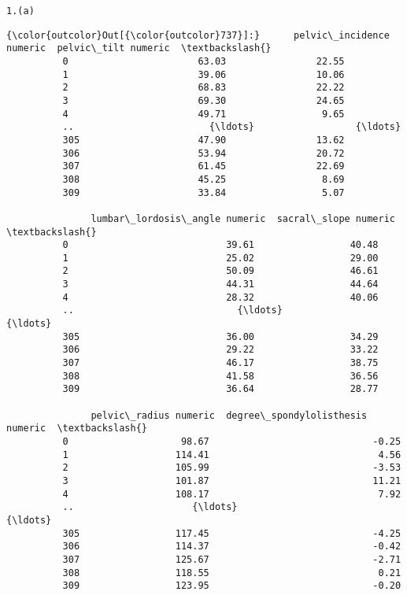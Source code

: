 \documentclass[11pt]{article}
\begin{document}
    \begin{Verbatim}[commandchars=\\\{\}]
1.(a)

    \end{Verbatim}

\begin{Verbatim}[commandchars=\\\{\}]
{\color{outcolor}Out[{\color{outcolor}737}]:}      pelvic\_incidence numeric  pelvic\_tilt numeric  \textbackslash{}
          0                       63.03                22.55   
          1                       39.06                10.06   
          2                       68.83                22.22   
          3                       69.30                24.65   
          4                       49.71                 9.65   
          ..                        {\ldots}                  {\ldots}   
          305                     47.90                13.62   
          306                     53.94                20.72   
          307                     61.45                22.69   
          308                     45.25                 8.69   
          309                     33.84                 5.07   
          
               lumbar\_lordosis\_angle numeric  sacral\_slope numeric  \textbackslash{}
          0                            39.61                 40.48   
          1                            25.02                 29.00   
          2                            50.09                 46.61   
          3                            44.31                 44.64   
          4                            28.32                 40.06   
          ..                             {\ldots}                   {\ldots}   
          305                          36.00                 34.29   
          306                          29.22                 33.22   
          307                          46.17                 38.75   
          308                          41.58                 36.56   
          309                          36.64                 28.77   
          
               pelvic\_radius numeric  degree\_spondylolisthesis numeric  \textbackslash{}
          0                    98.67                             -0.25   
          1                   114.41                              4.56   
          2                   105.99                             -3.53   
          3                   101.87                             11.21   
          4                   108.17                              7.92   
          ..                     {\ldots}                               {\ldots}   
          305                 117.45                             -4.25   
          306                 114.37                             -0.42   
          307                 125.67                             -2.71   
          308                 118.55                              0.21   
          309                 123.95                             -0.20   
          

\end{Verbatim}
\end{document}

